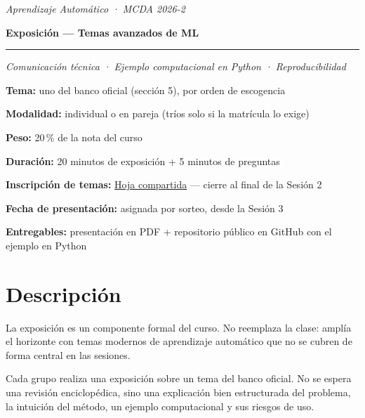 \documentclass[11pt,letterpaper]{article}
\newcommand{\signup}{https://eafit-my.sharepoint.com/:x:/g/personal/avasquezr3_eafit_edu_co/IQBMNr9rRCRzSIhl0wmT5yroAXJ4WnD7ZvdjMnQujZHcw5Y?e=CsqvSX}
\begin{document}
{\itshape\color{softgray}Aprendizaje Automático · MCDA 2026-2}\par\vspace{-4pt}
{\color{eafitnavy}\fontsize{22}{27}\selectfont\bfseries Exposición — Temas avanzados de ML}\par\vspace{-2pt}
{\color{eafitaccent}\rule{\textwidth}{2pt}}\par\vspace{-2pt}
{\itshape\color{softgray}Comunicación técnica · Ejemplo computacional en Python · Reproducibilidad}\par

\begin{tcolorbox}[enhanced,sharp corners,colback=boxfill,colframe=gridgray,boxrule=0.5pt,
  borderline north={2pt}{0pt}{eafitaccent},left=10pt,right=10pt,top=8pt,bottom=8pt,before skip=8pt,after skip=4pt]
  \setlength{\parskip}{5pt}
  {\color{eafitnavy}\bfseries Tema:} uno del banco oficial (sección 5), por orden de escogencia\par
  {\color{eafitnavy}\bfseries Modalidad:} individual o en pareja (tríos solo si la matrícula lo exige)\par
  {\color{eafitnavy}\bfseries Peso:} 20\,\% de la nota del curso\par
  {\color{eafitnavy}\bfseries Duración:} 20 minutos de exposición + 5 minutos de preguntas\par
  {\color{eafitnavy}\bfseries Inscripción de temas:} \href{\signup}{Hoja compartida} — cierre al final de la Sesión 2\par
  {\color{eafitnavy}\bfseries Fecha de presentación:} asignada por sorteo, desde la Sesión 3\par
  {\color{eafitnavy}\bfseries Entregables:} presentación en PDF + repositorio público en GitHub con el ejemplo en Python
\end{tcolorbox}

\section{Descripción}
La exposición es un componente formal del curso. No reemplaza la clase: amplía el horizonte con temas modernos de aprendizaje automático que no se cubren de forma central en las sesiones.

Cada grupo realiza una exposición sobre un tema del banco oficial. No se espera una revisión enciclopédica, sino una explicación bien estructurada del problema, la intuición del método, un ejemplo computacional y sus riesgos de uso.
\end{document}
